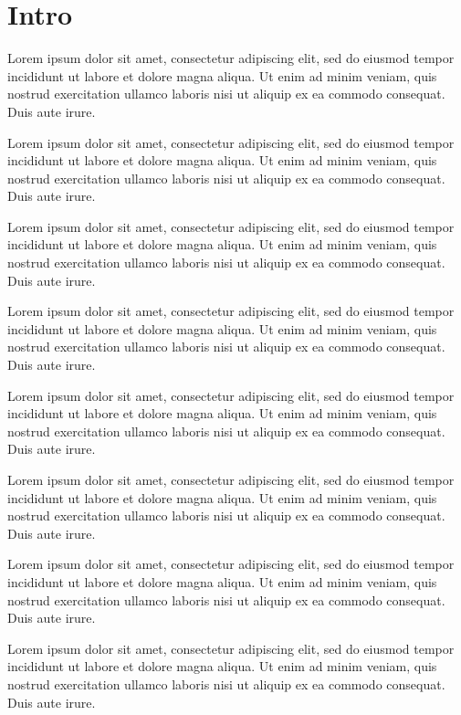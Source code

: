 \documentclass{article}
\begin{document}
\section{Intro}

\vspace{6pt}
\label{v1}Lorem ipsum dolor sit amet, consectetur adipiscing elit, sed do eiusmod tempor incididunt ut labore et dolore magna aliqua. Ut enim ad minim veniam, quis nostrud exercitation ullamco laboris nisi ut aliquip ex ea commodo consequat.\label{p1} Duis aute irure.

\label{v2}Lorem ipsum dolor sit amet, consectetur adipiscing elit, sed do eiusmod tempor incididunt ut labore et dolore magna aliqua. Ut enim ad minim veniam, quis nostrud exercitation ullamco laboris nisi ut aliquip ex ea commodo consequat.\label{p2} Duis aute irure.

\label{v3}Lorem ipsum dolor sit amet, consectetur adipiscing elit, sed do eiusmod tempor incididunt ut labore et dolore magna aliqua. Ut enim ad minim veniam, quis nostrud exercitation ullamco laboris nisi ut aliquip ex ea commodo consequat.\label{p3} Duis aute irure.

\label{v4}Lorem ipsum dolor sit amet, consectetur adipiscing elit, sed do eiusmod tempor incididunt ut labore et dolore magna aliqua. Ut enim ad minim veniam, quis nostrud exercitation ullamco laboris nisi ut aliquip ex ea commodo consequat.\label{p4} Duis aute irure.

\label{v5}Lorem ipsum dolor sit amet, consectetur adipiscing elit, sed do eiusmod tempor incididunt ut labore et dolore magna aliqua. Ut enim ad minim veniam, quis nostrud exercitation ullamco laboris nisi ut aliquip ex ea commodo consequat.\label{p5} Duis aute irure.

\label{v6}Lorem ipsum dolor sit amet, consectetur adipiscing elit, sed do eiusmod tempor incididunt ut labore et dolore magna aliqua. Ut enim ad minim veniam, quis nostrud exercitation ullamco laboris nisi ut aliquip ex ea commodo consequat.\label{p6} Duis aute irure.

\label{v7}Lorem ipsum dolor sit amet, consectetur adipiscing elit, sed do eiusmod tempor incididunt ut labore et dolore magna aliqua. Ut enim ad minim veniam, quis nostrud exercitation ullamco laboris nisi ut aliquip ex ea commodo consequat.\label{p7} Duis aute irure.

\label{v8}Lorem ipsum dolor sit amet, consectetur adipiscing elit, sed do eiusmod tempor incididunt ut labore et dolore magna aliqua. Ut enim ad minim veniam, quis nostrud exercitation ullamco laboris nisi ut aliquip ex ea commodo consequat.\label{p8} Duis aute irure.
\end{document}
